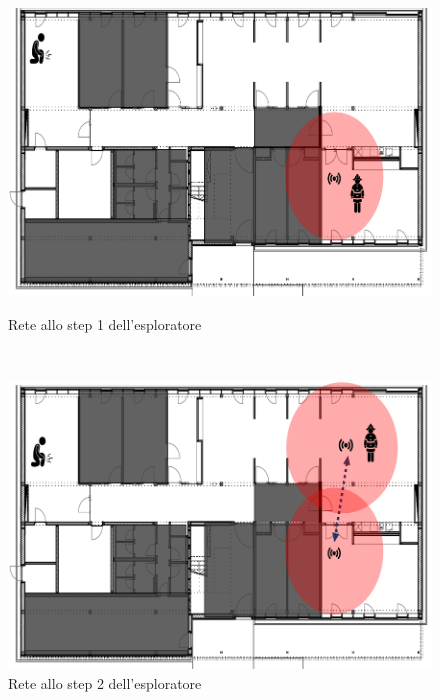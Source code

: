 \begin{figure}[h]
	\begin{minipage}[b]{6cm}
		\centering
		\includegraphics[scale=0.35]{Introduzione/intervento_step_1.png}
		\caption{Rete allo step 1 dell'esploratore}
		\label{fig:step1}
	\end{minipage}
	\ \hspace{10 mm} \
	\begin{minipage}[b]{6cm}
		\centering
		\includegraphics[scale=0.35]{Introduzione/intervento_step_2.png}
		\caption{Rete allo step 2 dell'esploratore}
		\label{fig:step2}
	\end{minipage}
\end{figure}


